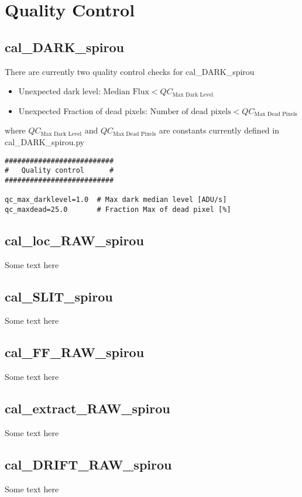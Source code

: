  \chapter{Quality Control}


\section{cal\_DARK\_spirou}
\label{section:qc_cal_DARK_spirou}

There are currently two quality control checks for cal\_DARK\_spirou
\begin{itemize}
\item Unexpected dark level: $\text{Median Flux} < QC_{\text{Max Dark Level}}$
\item Unexpected Fraction of dead pixels: $\text{Number of dead pixels} < QC_{\text{Max Dead Pixels}}$
\end{itemize}

where $QC_{\text{Max Dark Level}}$ and $QC_{\text{Max Dead Pixels}}$ are constants currently defined in cal\_DARK\_spirou.py
\begin{lstlisting}[style=pythonstyle]
##########################
#   Quality control      #
##########################

qc_max_darklevel=1.0  # Max dark median level [ADU/s]  
qc_maxdead=25.0       # Fraction Max of dead pixel [%]
\end{lstlisting}

\section{cal\_loc\_RAW\_spirou}
\label{section:qc_cal_loc_RAW_spirou}

Some text here

\section{cal\_SLIT\_spirou}
\label{section:qc_cal_SLIT_spirou}

Some text here

\section{cal\_FF\_RAW\_spirou}
\label{section:qc_cal_FF_RAW_spirou}

Some text here

\section{cal\_extract\_RAW\_spirou}
\label{section:qc_cal_extract_RAW_spirou}

Some text here

\section{cal\_DRIFT\_RAW\_spirou}
\label{section:qc_cal_DRIFT_RAW_spirou}

Some text here